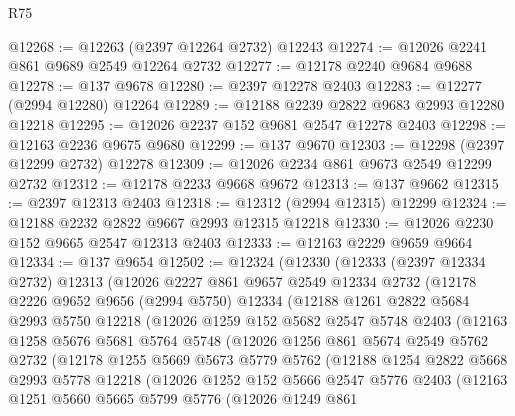 \begin{lexlean}{R75}
\begin{coremodule}
@12268 := @12263 (@2397 @12264 @2732) @12243
@12274 := @12026 @2241 @861 @9689 @2549 @12264 @2732
@12277 := @12178 @2240 @9684 @9688
@12278 := @137 @9678
@12280 := @2397 @12278 @2403
@12283 := @12277 (@2994 @12280) @12264
@12289 := @12188 @2239 @2822 @9683 @2993 @12280 @12218
@12295 := @12026 @2237 @152 @9681 @2547 @12278 @2403
@12298 := @12163 @2236 @9675 @9680
@12299 := @137 @9670
@12303 := @12298 (@2397 @12299 @2732) @12278
@12309 := @12026 @2234 @861 @9673 @2549 @12299 @2732
@12312 := @12178 @2233 @9668 @9672
@12313 := @137 @9662
@12315 := @2397 @12313 @2403
@12318 := @12312 (@2994 @12315) @12299
@12324 := @12188 @2232 @2822 @9667 @2993 @12315 @12218
@12330 := @12026 @2230 @152 @9665 @2547 @12313 @2403
@12333 := @12163 @2229 @9659 @9664
@12334 := @137 @9654
@12502 := @12324
    (@12330
      (@12333
        (@2397 @12334 @2732)
        @12313
        (@12026
          @2227
          @861
          @9657
          @2549
          @12334
          @2732
          (@12178
            @2226
            @9652
            @9656
            (@2994 @5750)
            @12334
            (@12188
              @1261
              @2822
              @5684
              @2993
              @5750
              @12218
              (@12026
                @1259
                @152
                @5682
                @2547
                @5748
                @2403
                (@12163
                  @1258
                  @5676
                  @5681
                  @5764
                  @5748
                  (@12026
                    @1256
                    @861
                    @5674
                    @2549
                    @5762
                    @2732
                    (@12178
                      @1255
                      @5669
                      @5673
                      @5779
                      @5762
                      (@12188
                        @1254
                        @2822
                        @5668
                        @2993
                        @5778
                        @12218
                        (@12026
                          @1252
                          @152
                          @5666
                          @2547
                          @5776
                          @2403
                          (@12163
                            @1251
                            @5660
                            @5665
                            @5799
                            @5776
                            (@12026
                              @1249
                              @861

\end{coremodule}
\end{lexlean}
